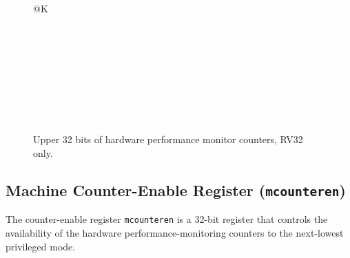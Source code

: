 \begin{figure}[h!]
{\footnotesize
\begin{center}
\begin{tabular}{@{}K}
 \\ \hline
{} \\ \hline
{} \\ \hline
{} \\ \hline
{} \\ \hline
{}  \\ \hline
{} \\ \hline
{} \\  \\
\end{tabular}
\end{center}
}
\vspace{-0.1in}
\caption{Upper 32 bits of hardware performance monitor counters, RV32 only.}
\end{figure}


\subsection{Machine Counter-Enable Register ({\tt mcounteren})}
\label{sec:mcounteren}

The counter-enable register {\tt mcounteren} is a 32-bit register that
controls the availability of the hardware performance-monitoring counters to
the next-lowest privileged mode.


